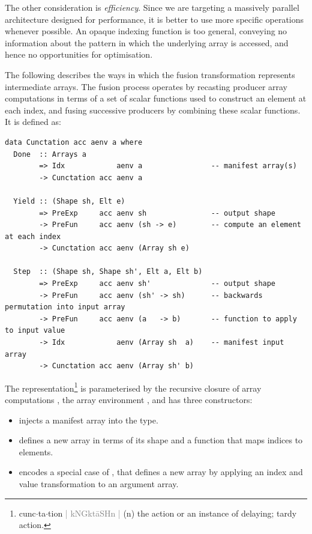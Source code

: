 The other consideration is \emph{efficiency}. Since we are targeting a massively
parallel architecture designed for performance, it is better to use more
specific operations whenever possible. An opaque indexing function is too
general, conveying no information about the pattern in which the underlying
array is accessed, and hence no opportunities for optimisation.

The following describes the ways in which the fusion transformation represents
intermediate arrays. The fusion process operates by recasting producer array
computations in terms of a set of scalar functions used to construct an element
at each index, %
and fusing successive producers by combining these scalar functions. It is
defined as:
%
\begin{lstlisting}[style=haskell
    ,caption={Representation of fusible producer arrays}]
data Cunctation acc aenv a where
  Done  :: Arrays a
        => Idx            aenv a                -- manifest array(s)
        -> Cunctation acc aenv a

  Yield :: (Shape sh, Elt e)
        => PreExp     acc aenv sh               -- output shape
        -> PreFun     acc aenv (sh -> e)        -- compute an element at each index
        -> Cunctation acc aenv (Array sh e)

  Step  :: (Shape sh, Shape sh', Elt a, Elt b)
        => PreExp     acc aenv sh'              -- output shape
        -> PreFun     acc aenv (sh' -> sh)      -- backwards permutation into input array
        -> PreFun     acc aenv (a   -> b)       -- function to apply to input value
        -> Idx            aenv (Array sh  a)    -- manifest input array
        -> Cunctation acc aenv (Array sh' b)
\end{lstlisting}
%
The representation\footnote{
cunc$\cdot$ta$\cdot$tion
\textcolor{gray}{|
kNGk\textquotesingle t\={a}SHn
\enspace{}\textquotesingle {}
|} (n) the action or an instance of delaying; tardy action.}
%
is parameterised by the recursive closure of array computations , the
array environment , and has three constructors:
%
\begin{itemize}
\item {} injects a manifest array into the type.

\item {} defines a new array in terms of its shape and a function
    that maps indices to elements.

\item {} encodes a special case of , that defines a new
    array by applying an index and value transformation to an argument array.

\end{itemize}

